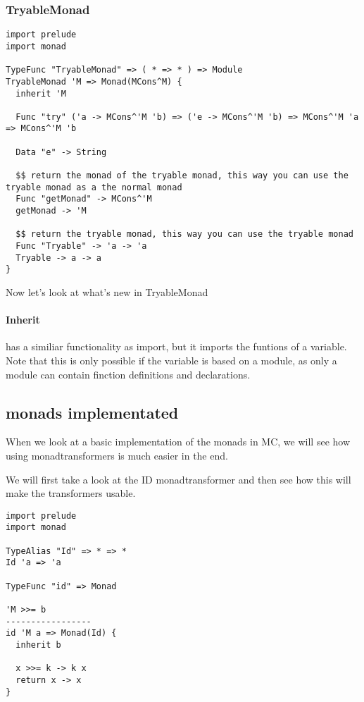 \subsubsection{TryableMonad}

\begin{lstlisting}
import prelude
import monad

TypeFunc "TryableMonad" => ( * => * ) => Module
TryableMonad 'M => Monad(MCons^M) {
  inherit 'M

  Func "try" ('a -> MCons^'M 'b) => ('e -> MCons^'M 'b) => MCons^'M 'a => MCons^'M 'b

  Data "e" -> String

  $$ return the monad of the tryable monad, this way you can use the tryable monad as a the normal monad
  Func "getMonad" -> MCons^'M
  getMonad -> 'M

  $$ return the tryable monad, this way you can use the tryable monad
  Func "Tryable" -> 'a -> 'a
  Tryable -> a -> a
}
\end{lstlisting}

Now let's look at what's new in TryableMonad

\paragraph{Inherit} has a similiar functionality as import, but it imports the funtions of a variable.
Note that this is only possible if the variable is based on a module, as only a module can contain finction definitions and declarations.


\subsection{monads implementated}

When we look at a basic implementation of the monads in MC, we will see how using monadtransformers is much easier in the end.

We will first take a look at the ID monadtransformer and then see how this will make the transformers usable.

\begin{lstlisting}
import prelude
import monad

TypeAlias "Id" => * => *
Id 'a => 'a

TypeFunc "id" => Monad

'M >>= b
-----------------
id 'M a => Monad(Id) {
  inherit b

  x >>= k -> k x
  return x -> x
}
\end{lstlisting}

